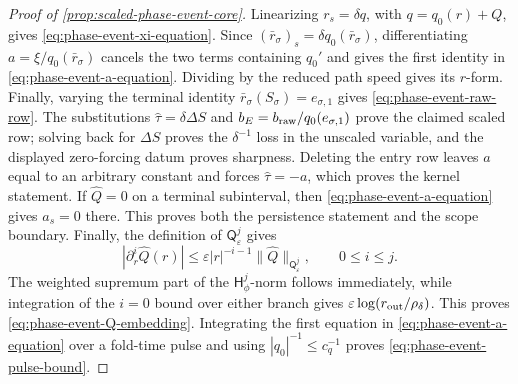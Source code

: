 \begin{proof}[Proof of \cref{prop:scaled-phase-event-core}]
Linearizing \(r_s=\delta q\), with
\(q=q_0(r)+Q\), gives
\cref{eq:phase-event-xi-equation}.  Since
\((\bar r_\sigma)_s=\delta q_0(\bar r_\sigma)\), differentiating
\(a=\xi/q_0(\bar r_\sigma)\) cancels the two terms containing \(q_0'\) and
gives the first identity in \cref{eq:phase-event-a-equation}.  Dividing by
the reduced path speed gives its \(r\)-form.  Finally, varying the terminal
identity \(\bar r_\sigma(S_\sigma)=e_{\sigma,1}\) gives
\cref{eq:phase-event-raw-row}.  The substitutions
\(\widehat\tau=\delta\Delta S\) and
\(b_E=b_{\rm raw}/q_0(e_{\sigma,1})\) prove the claimed scaled row; solving
back for \(\Delta S\) proves the \(\delta^{-1}\) loss in the unscaled
variable, and the displayed zero-forcing datum proves sharpness.  Deleting
the entry row leaves \(a\) equal to an arbitrary constant and forces
\(\widehat\tau=-a\), which proves the kernel statement.  If
\(\widehat Q=0\) on a terminal subinterval, then
\cref{eq:phase-event-a-equation} gives \(a_s=0\) there.  This proves both
the persistence statement and the scope boundary.  Finally, the definition
of \(\mathsf Q_\varepsilon^j\) gives
\[
 |\partial_r^i\widehat Q(r)|
 \le \varepsilon |r|^{-i-1}
       \|\widehat Q\|_{\mathsf Q_\varepsilon^j},
 \qquad 0\le i\le j.
\]
The weighted supremum part of the \(\mathsf H_\phi^j\)-norm follows
immediately, while integration of the \(i=0\) bound over either branch gives
\(\varepsilon\log(r_{\rm out}/\rho_\delta)\).  This proves
\cref{eq:phase-event-Q-embedding}.  Integrating the first equation in
\cref{eq:phase-event-a-equation} over a fold-time pulse and using
\(|q_0|^{-1}\le c_q^{-1}\) proves
\cref{eq:phase-event-pulse-bound}.
\end{proof}

